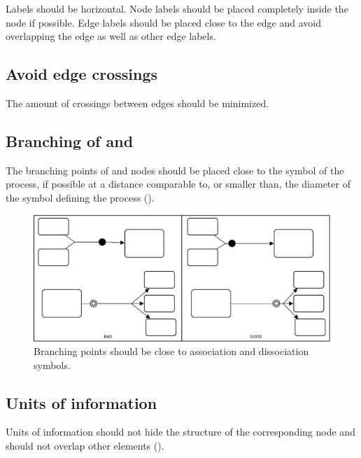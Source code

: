 Labels should be horizontal. Node labels should be placed completely
inside the node if possible. Edge labels should be placed close to
the edge and avoid overlapping the edge as well as other edge
labels.

\subsection{Avoid edge crossings}

The amount of crossings between edges should be minimized.

\subsection{Branching of  and }

The branching points of  and  nodes should be placed close to the symbol of the process, if possible at a distance comparable to, or smaller than, the diameter of the symbol defining the process ().

\begin{figure}[htb]
  \centering
  \includegraphics[scale=0.5]{images/build/layout_branching.pdf}
  \caption{Branching points should be close to association and dissociation symbols.}\label{fig:branching}
\end{figure}

\subsection{Units of information}

Units of information should not hide the structure of the
corresponding node and should not overlap other
elements ().

